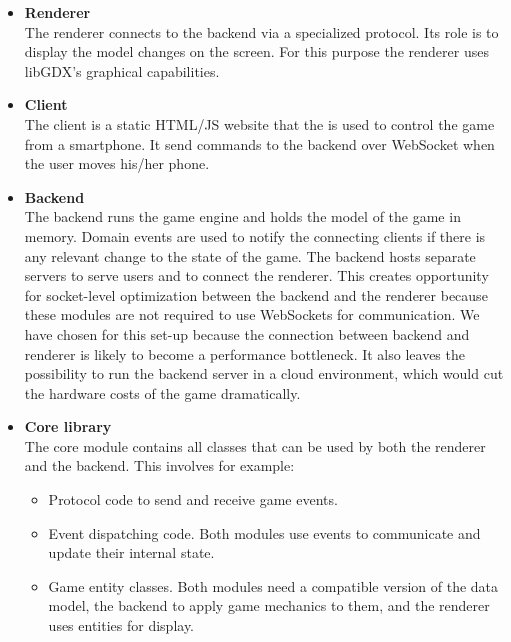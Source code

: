 \documentclass[11pt,a4paper]{article}
\begin{document}
\begin{itemize}
\item \textbf{Renderer} \\
The renderer connects to the backend via a specialized protocol. Its role is to display the model changes on the screen. For this purpose the renderer uses libGDX's graphical capabilities.

\item \textbf{Client} \\
The client is a static HTML/JS website that the is used to control the game from a smartphone. It send commands to the backend over WebSocket when the user moves his/her phone.

\item \textbf{Backend} \\
The backend runs the game engine and holds the model of the game in memory. Domain events are used to notify the connecting clients if there is any relevant change to the state of the game. The backend hosts separate servers to serve users and to connect the renderer. This creates opportunity for socket-level optimization between the backend and the renderer because these modules are not required to use WebSockets for communication. We have chosen for this set-up because the connection between backend and renderer is likely to become a performance bottleneck. It also leaves the possibility to run the backend server in a cloud environment, which would cut the hardware costs of the game dramatically.


\item \textbf{Core library} \\
The core module contains all classes that can be used by both the renderer and the backend. This involves for example:
\begin{itemize}
\item Protocol code to send and receive game events.
\item Event dispatching code. Both modules use events to communicate and update their internal state.
\item Game entity classes. Both modules need a compatible version of the data model, the backend to apply game mechanics to them, and the renderer uses entities for display.
\end{itemize}

\end{itemize}
\end{document}
